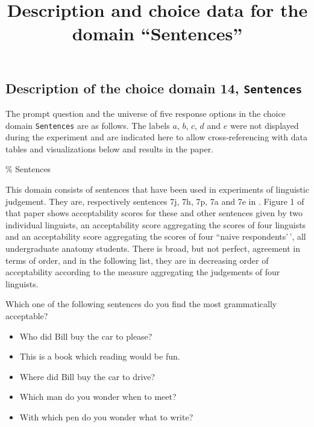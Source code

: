 \documentclass[
]{article}
\title{Description and choice data for the domain ``Sentences''}
\author{}
\date{\vspace{-2.5em}}
\begin{document}
\maketitle

\graphicspath{
  {../experiment/figures/}       %
}

\subsection{\texorpdfstring{Description of the choice domain 14,
\texttt{Sentences}}{Description of the choice domain 14, Sentences}}\label{description-of-the-choice-domain-14-sentences}

The prompt question and the universe of five response options in the
choice domain \texttt{Sentences} are as follows. The labels \(a\),
\(b\), \(c\), \(d\) and \(e\) were not displayed during the experiment
and are indicated here to allow cross-referencing with data tables and
visualizations below and results in the paper.

\% Sentences

This domain consists of sentences that have been used in experiments of
linguistic judgement. They are, respectively sentences 7j, 7h, 7p, 7a
and 7e in . Figure 1 of that paper shows
acceptability scores for these and other sentences given by two
individual linguists, an acceptability score aggregating the scores of
four linguists and an acceptability score aggregating the scores of four
``naive respondents'\,', all undergraduate anatomy students. There is
broad, but not perfect, agreement in terms of order, and in the
following list, they are in decreasing order of acceptability according
to the measure aggregating the judgements of four linguists.

\begin{tcolorbox}
Which one of the following sentences do you find the most grammatically acceptable?

\begin{itemize}
    \setlength\itemsep{-5pt}
    \item Who did Bill buy the car to please?
    \item This is a book which reading would be fun.
    \item Where did Bill buy the car to drive?
    \item Which man do you wonder when to meet?
    \item With which pen do you wonder what to write?
\end{itemize}
\end{tcolorbox}
\end{document}
